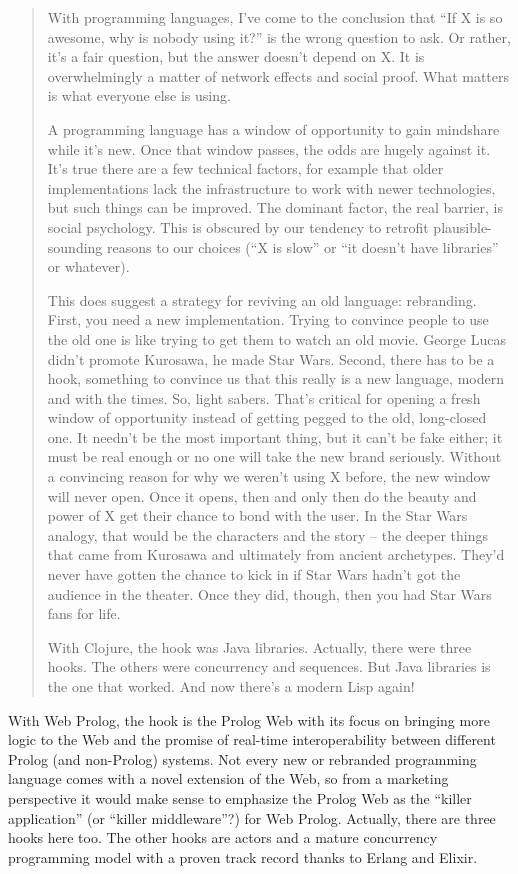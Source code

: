 \begin{quote}
With programming languages, I've come to the conclusion that ``If X is so awesome, why is nobody using it?'' is the wrong question to ask. Or rather, it's a fair question, but the answer doesn't depend on X. It is overwhelmingly a matter of network effects and social proof. What matters is what everyone else is using.

A programming language has a window of opportunity to gain mindshare while it's new. Once that window passes, the odds are hugely against it. It's true there are a few technical factors, for example that older implementations lack the infrastructure to work with newer technologies, but such things can be improved. The dominant factor, the real barrier, is social psychology. This is obscured by our tendency to retrofit plausible-sounding reasons to our choices (``X is slow'' or ``it doesn't have libraries'' or whatever).

This does suggest a strategy for reviving an old language: rebranding. First, you need a new implementation. Trying to convince people to use the old one is like trying to get them to watch an old movie. George Lucas didn't promote Kurosawa, he made Star Wars. Second, there has to be a hook, something to convince us that this really is a new language, modern and with the times. So, light sabers. That's critical for opening a fresh window of opportunity instead of getting pegged to the old, long-closed one. It needn't be the most important thing, but it can't be fake either; it must be real enough or no one will take the new brand seriously. Without a convincing reason for why we weren't using X before, the new window will never open. Once it opens, then and only then do the beauty and power of X get their chance to bond with the user. In the Star Wars analogy, that would be the characters and the story -- the deeper things that came from Kurosawa and ultimately from ancient archetypes. They'd never have gotten the chance to kick in if Star Wars hadn't got the audience in the theater. Once they did, though, then you had Star Wars fans for life.

With Clojure, the hook was Java libraries. Actually, there were three hooks. The others were concurrency and sequences. But Java libraries is the one that worked. And now there's a modern Lisp again!
\end{quote}

\noindent With Web Prolog, the hook is the Prolog Web with its focus on bringing more logic to the Web and the promise of real-time interoperability between different Prolog (and non-Prolog) systems. Not every new or rebranded programming language comes with a novel extension of the Web, so from a marketing perspective it would make sense to emphasize the Prolog Web as the ``killer application''  (or ``killer middleware''?) for Web Prolog. Actually, there are three hooks here too. The other hooks are actors and a mature concurrency programming model with a proven track record thanks to Erlang and Elixir. 


